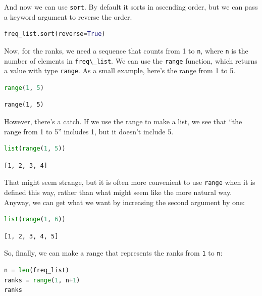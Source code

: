 \documentclass[
]{book}
\newcommand{\passthrough}[1]{#1}
\begin{document}
And now we can use \passthrough{\lstinline!sort!}. By default it sorts
in ascending order, but we can pass a keyword argument to reverse the
order.

\begin{lstlisting}[language=Python]
freq_list.sort(reverse=True)
\end{lstlisting}

Now, for the ranks, we need a sequence that counts from 1 to
\passthrough{\lstinline!n!}, where \passthrough{\lstinline!n!} is the
number of elements in \passthrough{\lstinline!freq\_list!}. We can use
the \passthrough{\lstinline!range!} function, which returns a value with
type \passthrough{\lstinline!range!}. As a small example, here's the
range from 1 to 5.

\begin{lstlisting}[language=Python]
range(1, 5)
\end{lstlisting}

\begin{lstlisting}
range(1, 5)
\end{lstlisting}

However, there's a catch. If we use the range to make a list, we see
that ``the range from 1 to 5'' includes 1, but it doesn't include 5.

\begin{lstlisting}[language=Python]
list(range(1, 5))
\end{lstlisting}

\begin{lstlisting}
[1, 2, 3, 4]
\end{lstlisting}

That might seem strange, but it is often more convenient to use
\passthrough{\lstinline!range!} when it is defined this way, rather than
what might seem like the more natural way. Anyway, we can get what we
want by increasing the second argument by one:

\begin{lstlisting}[language=Python]
list(range(1, 6))
\end{lstlisting}

\begin{lstlisting}
[1, 2, 3, 4, 5]
\end{lstlisting}

So, finally, we can make a range that represents the ranks from
\passthrough{\lstinline!1!} to \passthrough{\lstinline!n!}:

\begin{lstlisting}[language=Python]
n = len(freq_list)
ranks = range(1, n+1)
ranks
\end{lstlisting}
\end{document}
